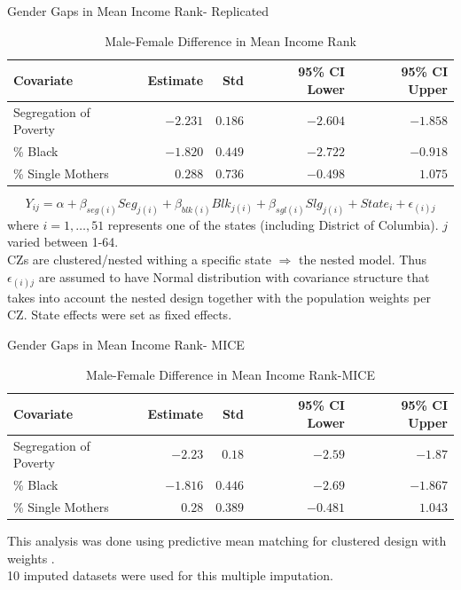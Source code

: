 \documentclass{beamer}
\begin{document}
\begin{frame}{Gender Gaps in Mean Income Rank- Replicated}


\begin{table}[ht]
	\centering
	\caption{Male-Female Difference in Mean Income Rank}
	\footnotesize
	\begin{tabular}{lrrrr}
		\hline
		Covariate & Estimate & Std  & 95\% CI Lower & 95\% CI Upper \\ 
		\hline
		Segregation of Poverty & $-2.231$ & $0.186$ & $-2.604$ & $-1.858$ \\ 
		\% Black & $-1.820$ & $0.449$ &  $-2.722$ & $-0.918$ \\ 
		\% Single Mothers & $0.288$ &  $0.736$ & $-0.498$ & $1.075$ \\ 
		\hline
	\end{tabular}
\end{table}
$$Y_{ij}= \alpha + \beta_{seg(i)}Seg_{j(i)} + \beta_{blk(i)}Blk_{j(i)} + \beta_{sgl(i)}Slg_{j(i)} + State_i + \epsilon_{(i)j} $$
where $i=1,\dots ,51$ represents one of the states (including District of Columbia). $j$ varied between 1-64.\\

CZs are clustered/nested withing a specific state $\Rightarrow$  the nested model. Thus $\epsilon_{(i)j}$  are assumed to have Normal distribution with covariance structure that takes into account the nested design together with the population weights per CZ. State effects were set as fixed effects.

\end{frame}

\begin{frame}{Gender Gaps in Mean Income Rank- MICE}


\begin{table}[ht]
	\centering
	\caption{Male-Female Difference in Mean Income Rank-MICE}
	\footnotesize
	\begin{tabular}{lrrrr}
		\hline
		Covariate & Estimate & Std  & 95\% CI Lower & 95\% CI Upper \\ 
		\hline
		Segregation of Poverty & $-2.23$ & $0.18$  & $-2.59$ & $-1.87$ \\ 
		\% Black & $-1.816$ & $0.446$ &  $-2.69$ & $-1.867$ \\ 
		\% Single Mothers & $0.28$ &  $0.389$ & $-0.481$ & $1.043$ \\ 
		\hline
	\end{tabular}
\end{table}
This analysis was done using predictive mean matching for clustered design with weights \citep{vink2015partioned}.\\
 10 imputed datasets were used for this multiple imputation.

\end{frame}
\end{document}
